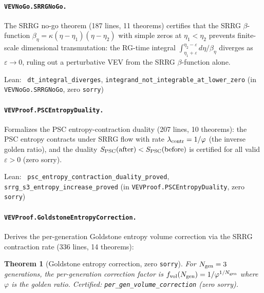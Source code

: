 \documentclass[11pt,a4paper]{article}
\newenvironment{leanref}%
  {\par\smallskip\noindent\begingroup\raggedright\textup{Lean:}~}%
  {\par\endgroup}
\newtheorem{theorem}{Theorem}[section]
\theoremstyle{definition}
\begin{document}
\paragraph{\texttt{VEVNoGo.SRRGNoGo.}}
The SRRG no-go theorem (187 lines, 11 theorems) certifies that the SRRG $\beta$-function
$\beta_\eta = \kappa(\eta - \eta_1)(\eta - \eta_2)$ with simple zeros at $\eta_1 < \eta_2$
prevents finite-scale dimensional transmutation: the RG-time integral
$\int_{\eta_1+\varepsilon}^{\eta_2-\varepsilon} d\eta / \beta_\eta$ diverges as
$\varepsilon\to 0$, ruling out a perturbative VEV from the SRRG $\beta$-function alone.

\begin{leanref}
\lstinline|dt_integral_diverges|, \lstinline|integrand_not_integrable_at_lower_zero|
\textup{(in \texttt{VEVNoGo.SRRGNoGo}, zero \texttt{sorry})}
\end{leanref}

\paragraph{\texttt{VEVProof.PSCEntropyDuality.}}
Formalizes the PSC entropy-contraction duality (207 lines, 10 theorems): the PSC entropy
contracts under SRRG flow with rate $\lambda_{\rm contr} = 1/\varphi$ (the inverse golden
ratio), and the duality
$S_{\rm PSC}(\text{after}) < S_{\rm PSC}(\text{before})$ is certified for all valid
$\varepsilon > 0$ (zero sorry).

\begin{leanref}
\lstinline|psc_entropy_contraction_duality_proved|,
\lstinline|srrg_s3_entropy_increase_proved|
\textup{(in \texttt{VEVProof.PSCEntropyDuality}, zero \texttt{sorry})}
\end{leanref}

\paragraph{\texttt{VEVProof.GoldstoneEntropyCorrection.}}
Derives the per-generation Goldstone entropy volume correction via the SRRG contraction
rate (336 lines, 14 theorems):

\begin{theorem}[Goldstone entropy correction, zero \texttt{sorry}]
For $N_{\rm gen} = 3$ generations, the per-generation correction factor is
$f_{\rm vol}(N_{\rm gen}) = 1/\varphi^{1/N_{\rm gen}}$ where $\varphi$ is the golden ratio.
Certified: \lstinline|per_gen_volume_correction| (zero sorry).
\end{theorem}
\end{document}
